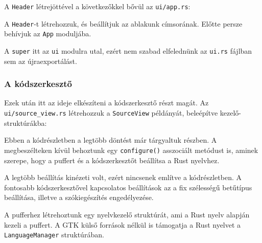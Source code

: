 A \texttt{Header} létrejöttével a következőkkel bővül az \texttt{ui/app.rs}:



A \texttt{Header}-t létrehozzuk, és beállítjuk az ablakunk címsorának.
Előtte persze behívjuk az \texttt{App} moduljába.

A \texttt{super} itt az \texttt{ui} modulra utal, ezért nem szabad elfelednünk az \texttt{ui.rs}
fájlban sem az újraexportálást.



\subsubsection{A kódszerkesztő}

Ezek után itt az ideje elkészíteni a kódszerkesztő részt magát.
Az \verb+ui/source_view.rs+ létrehozzuk a \texttt{SourceView} példányát,
beleépítve kezelő-struktúrákba:



Ebben a kódrészletben a legtöbb döntést már tárgyaltuk  részben.
A megbeszélteken kívül behoztunk egy \texttt{configure()} asszociált metódust is,
aminek szerepe, hogy a puffert és a kódszerkesztőt beállítsa a Rust nyelvhez.

A legtöbb beállítás kinézeti volt, ezért nincsenek említve a kódrészletben.
A fontosabb kódszerkesztővel kapcsolatos beállítások az a fix szélességű betűtípus beállítása,
illetve a szókiegészítés engedélyezése.

A pufferhez létrehoztunk egy nyelvkezelő struktúrát, ami a Rust nyelv alapján kezeli a puffert.
A GTK külső források nélkül is támogatja a Rust nyelvet a \texttt{LanguageManager} struktúrában.



